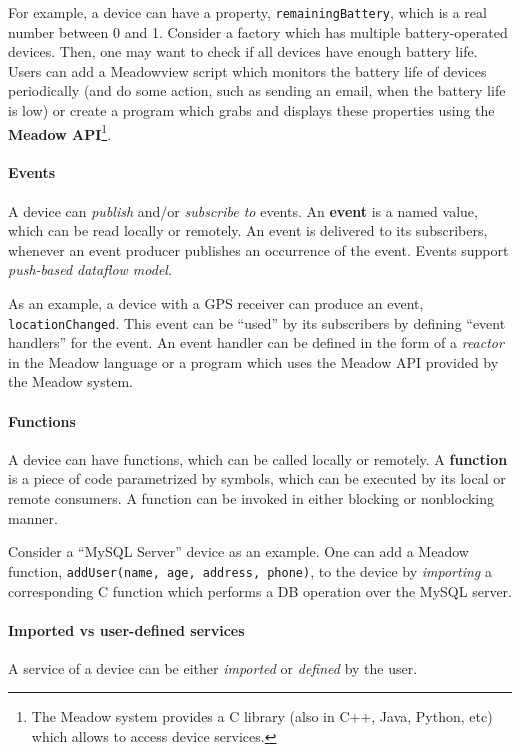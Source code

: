 \documentclass{note}
\begin{document}
For example, a device can have a property,
\textcolor{red2}{\texttt{remainingBattery}}, which is a real number
between 0 and 1. Consider a factory which has multiple battery-operated
devices. Then, one may want to check if all devices have enough battery life. 
Users can add a Meadowview script which monitors the battery life of devices
periodically (and do some action, such as sending an email, when the
battery life is low)  
or create a program which grabs and displays these properties
using the \textcolor{blue2}{\bf{}Meadow API}\footnote{\textcolor{green2}{The
    Meadow system provides a C library (also in C++, Java, Python, etc) which
    allows to access device services.}}.


\paragraph{Events}
A device can {\em publish\/} and/or {\em subscribe to\/} events.
An \textcolor{blue2}{\bf{}event} is a named value, 
which can be read locally or remotely. 
An event is delivered to its subscribers, whenever
an event producer publishes an occurrence of the event.
Events support {\em push-based dataflow model\/}.

As an example, a device with a GPS receiver can produce an event,
\textcolor{red2}{\texttt{locationChanged}}. 
This event can be ``used'' by its subscribers by defining ``event handlers''
for the event. An event handler can be defined in the form of a {\em
  reactor\/} in the Meadow language or a program which uses the Meadow API
provided by the Meadow system.


\paragraph{Functions}
A device can have functions, which can be called locally or remotely.
A \textcolor{blue2}{\bf{}function} is a piece of code parametrized by
symbols, which can be executed by its local or remote consumers.
A function can be invoked in either blocking or nonblocking manner.

Consider a ``MySQL Server'' device as an example. One can add
a Meadow function, \textcolor{red2}{\texttt{addUser(name, age, address,
    phone)}}, to the device by \textcolor{blue2}{\em importing\/} a
corresponding C function which performs a DB operation over the MySQL server.


\paragraph{Imported vs user-defined services}
A service of a device can be either {\em imported\/}  or {\em defined\/} by
the user. 
\end{document}
